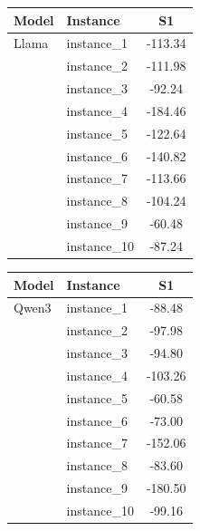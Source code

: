 \documentclass[sigconf]{acmart}
\begin{document}
\begin{table}[htbp]
\begin{tabular}{llc}
\toprule
\textbf{Model} & \textbf{Instance} & \textbf{S1} \\
\midrule
Llama & instance\_1 & -113.34 \\
 & instance\_2 & -111.98 \\
 & instance\_3 & -92.24 \\
 & instance\_4 & -184.46 \\
 & instance\_5 & -122.64 \\
 & instance\_6 & -140.82 \\
 & instance\_7 & -113.66 \\
 & instance\_8 & -104.24 \\
 & instance\_9 & -60.48 \\
 & instance\_10 & -87.24 \\
\bottomrule
\end{tabular}


\begin{tabular}{llc}
\toprule
\textbf{Model} & \textbf{Instance} & \textbf{S1} \\
\midrule
Qwen3 & instance\_1 & -88.48 \\
 & instance\_2 & -97.98 \\
 & instance\_3 & -94.80 \\
 & instance\_4 & -103.26 \\
 & instance\_5 & -60.58 \\
 & instance\_6 & -73.00 \\
 & instance\_7 & -152.06 \\
 & instance\_8 & -83.60 \\
 & instance\_9 & -180.50 \\
 & instance\_10 & -99.16 \\
\bottomrule
\end{tabular}
\end{table}
\end{document}
